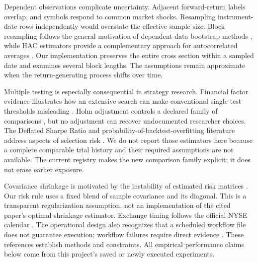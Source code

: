 Dependent observations complicate uncertainty. Adjacent forward-return labels overlap, and symbols respond to common market shocks. Resampling instrument-date rows independently would overstate the effective sample size. Block resampling follows the general motivation of dependent-data bootstrap methods \citep{kunsch1989}, while HAC estimators provide a complementary approach for autocorrelated averages \citep{newey1987}. Our implementation preserves the entire cross section within a sampled date and examines several block lengths. The assumptions remain approximate when the return-generating process shifts over time.

Multiple testing is especially consequential in strategy research. Financial factor evidence illustrates how an extensive search can make conventional single-test thresholds misleading \citep{harvey2016}. Holm adjustment controls a declared family of comparisons \citep{holm1979}, but no adjustment can recover undocumented researcher choices. The Deflated Sharpe Ratio and probability-of-backtest-overfitting literature address aspects of selection risk \citep{bailey2014,bailey2015}. We do not report those estimators here because a complete comparable trial history and their required assumptions are not available. The current registry makes the new comparison family explicit; it does not erase earlier exposure.

Covariance shrinkage is motivated by the instability of estimated risk matrices \citep{ledoit2004}. Our risk rule uses a fixed blend of sample covariance and its diagonal. This is a transparent regularization assumption, not an implementation of the cited paper's optimal shrinkage estimator. Exchange timing follows the official NYSE calendar \citep{nyse2026}. The operational design also recognizes that a scheduled workflow file does not guarantee execution; workflow failures require direct evidence \citep{github2026}. These references establish methods and constraints. All empirical performance claims below come from this project's saved or newly executed experiments.
